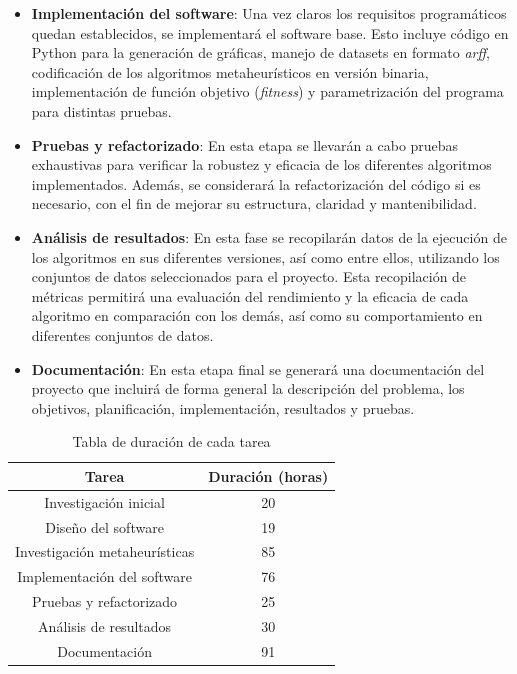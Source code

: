\begin{itemize}
      \item \textbf{Implementación del software}: Una vez claros los requisitos programáticos quedan establecidos, se implementará el software base. Esto incluye código en Python para la generación de gráficas, manejo de datasets en formato \textit{arff}, codificación de los algoritmos metaheurísticos en versión binaria, implementación de función objetivo (\textit{fitness}) y parametrización del programa para distintas pruebas.
      \item \textbf{Pruebas y refactorizado}: En esta etapa se llevarán a cabo pruebas exhaustivas para verificar la robustez y eficacia de los diferentes algoritmos implementados. Además, se considerará la refactorización del código si es necesario, con el fin de mejorar su estructura, claridad y mantenibilidad.
      \item \textbf{Análisis de resultados}: En esta fase se recopilarán datos de la ejecución de los algoritmos en sus diferentes versiones, así como entre ellos, utilizando los conjuntos de datos seleccionados para el proyecto. Esta recopilación de métricas permitirá una evaluación del rendimiento y la eficacia de cada algoritmo en comparación con los demás, así como su comportamiento en diferentes conjuntos de datos.
      \item \textbf{Documentación}: En esta etapa final se generará una documentación del proyecto que incluirá de forma general la descripción del problema, los objetivos, planificación, implementación, resultados y pruebas.
\end{itemize}

\begin{table}[htp]
      \centering
      \begin{tabular}{c|c}
            Tarea                         & Duración (horas) \\ \hline
            Investigación inicial         & 20               \\
            Diseño del software           & 19               \\
            Investigación metaheurísticas & 85               \\
            Implementación del software   & 76               \\
            Pruebas y refactorizado       & 25               \\ 
            Análisis de resultados        & 30               \\
            Documentación                 & 91               \\ \hline
      \end{tabular}
      \caption{Tabla de duración de cada tarea}
\end{table}

